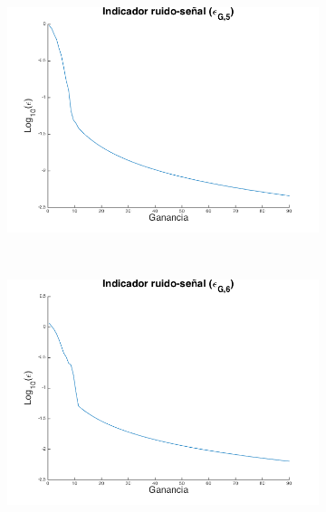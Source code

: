 \documentclass[letterpaper,11pt]{article}
\begin{document}
\begin{figure}[H]
    \centering
    \begin{subfigure}[b]{0.3\textwidth}
        \includegraphics[width=\textwidth]{img/parte_c/curva5.png}
    \end{subfigure}
    ~ %
    \begin{subfigure}[b]{0.3\textwidth}
        \includegraphics[width=\textwidth]{img/parte_c/curva6.png}
    \end{subfigure}
    ~ %
    \begin{subfigure}[b]{0.3\textwidth}

\end{subfigure}
\end{figure}
\end{document}
